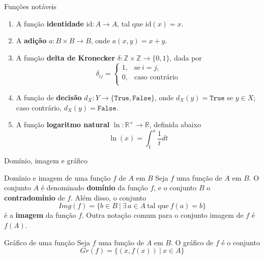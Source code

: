 \begin{frame}[fragile]{Funções notáveis}

    \begin{enumerate}
        \item A função \textbf{identidade} $\mathrm{id}: A\to A$, tal que $\mathrm{id}(x) = x$.

        \item A \textbf{adição} $a: B\times B \to B$, onde $a(x, y) = x + y$.
 
        \item A função \textbf{delta de Kronecker} $\delta: \mathbb{Z}\times \mathbb{Z}\to 
            \lbrace 0, 1\rbrace$, dada por
            \[
                \delta_{ij} = \left\lbrace \begin{array}{ll} 1, & \mbox{se}\ i = j, \\
                                                             0, & \mbox{caso contrário}\\
                                           \end{array} \right.
            \]

        \item A função de \textbf{decisão} $d_X: Y\to \lbrace \mathtt{True, False}\rbrace$, onde
            $d_X(y) = \mathtt{True}$ se $y\in X$; caso contrário, $d_X(y) = \mathtt{False}$.

        \item A função \textbf{logaritmo natural} $\ln: \mathbb{R^+}\to \mathbb{R}$, definida 
        abaixo
        \[
            \ln(x) = \int_1^x \frac{1}{t} dt
        \]

    \end{enumerate}

\end{frame}

\begin{frame}[fragile]{Domínio, imagem e gráfico}

    \begin{block}{Domínio e imagem de uma função $f$ de $A$ em $B$}
        Seja $f$ uma função de $A$ em $B$. O conjunto $A$ é denominado \textbf{domínio} da
            função $f$, e o conjunto $B$ o \textbf{contradomínio} de $f$. Além disso, o conjunto
        \[
            Img(f) = \lbrace b \in B\ |\ \exists\, a\in A\ \mbox{tal que}\ f(a) = b \rbrace
        \]
        é a \textbf{imagem} da função $f$. Outra notação comum para o conjunto imagem de $f$ é 
        $f(A)$.
    \end{block}

    \vspace{0.05in}

    \begin{block}{Gráfico de uma função}
        Seja $f$ uma função de $A$ em $B$. O gráfico de $f$ é o conjunto
        \[
            Gr(f) = \lbrace (x, f(x))\ |\ x\in A\rbrace
        \]
    \end{block}

\end{frame}

